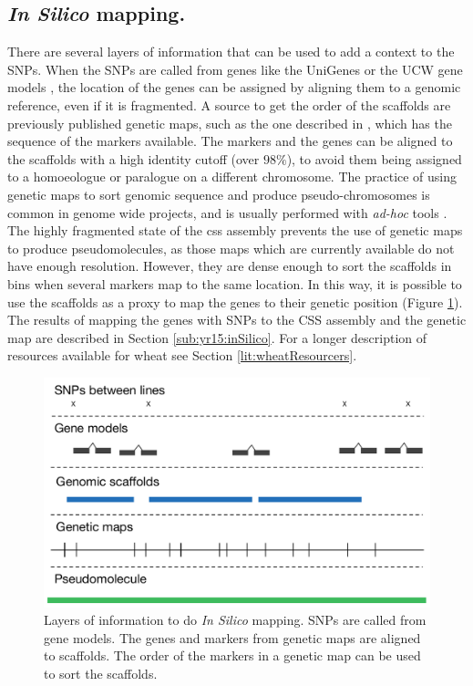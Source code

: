 \subsection{\textit{In Silico} mapping.}
There are several layers of information that can be used to add a context to the SNPs. 
When the SNPs are called from genes like the UniGenes \citep{PontiusJUWagnerL2002} or the UCW gene models \citep{Krasileva2013}, the location of the genes can be assigned by aligning them to a genomic reference, even if it is fragmented. 
A source to get the order of the scaffolds are previously published genetic maps, such as the one described in \citet{Wang2014}, which has the sequence of the markers available.
The markers and the genes can be aligned to the scaffolds with a high identity cutoff (over $98\%$), to avoid them being assigned to a homoeologue or paralogue on a different chromosome.
The practice of using genetic maps to sort genomic sequence and produce pseudo-chromosomes is common in genome wide projects, and is usually performed with \textit{ad-hoc} tools \citep{Tang2015}.
The highly fragmented state of the \acrshort{css} assembly prevents the use of genetic maps to produce pseudomolecules, as those maps which are currently available do not have enough resolution.
However, they are dense enough to sort the scaffolds in bins when several markers map to the same location. 
In this way, it is possible to use the scaffolds as a proxy to map the genes to their genetic position (Figure \ref{fig:yr15:layersOfMapping}).
The results of mapping the genes with SNPs to the CSS assembly and the genetic map are described in Section \ref{sub:yr15:inSilico}. 
For a longer description of resources available for wheat see Section \ref{lit:wheatResourcers}.

\begin{figure}
  \centering
  \includegraphics[width=1\textwidth]{Yr15/Figures/mapping/layersOfMapping.pdf}
  \caption[Layers of information to do \textit{In Silico} mapping.]{Layers of information to do \textit{In Silico} mapping. SNPs are called from gene models. The genes and markers from genetic maps are aligned to scaffolds. The order of the markers in a genetic map can be used to sort the scaffolds.} 
  \label{fig:yr15:layersOfMapping}
\end{figure}

